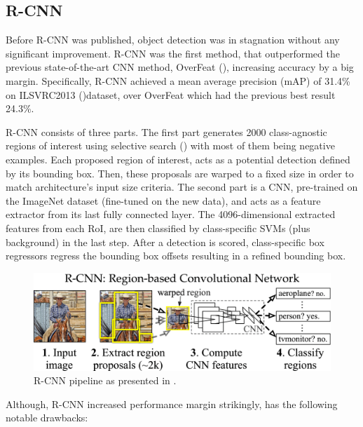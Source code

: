 \subsection{R-CNN}
Before R-CNN was published, object detection was in stagnation without any significant improvement. R-CNN was the first method, that outperformed the previous state-of-the-art CNN method, OverFeat (\cite{sermanet2013overfeat}), increasing accuracy by a big margin. Specifically, R-CNN achieved a mean average precision (mAP) of 31.4\% on ILSVRC2013 (\cite{deng2009imagenet})dataset, over OverFeat which had the previous best result 24.3\%.

R-CNN consists of three parts. The first part generates 2000 class-agnostic regions of interest using selective search (\cite{uijlings2013selective}) with most of them being negative examples. Each proposed region of interest, acts as a potential detection defined by its bounding box. Then, these proposals are warped to a fixed size in order to match architecture's input size criteria. 
The second part is a CNN, pre-trained on the ImageNet dataset (fine-tuned on the new data), and acts as a feature extractor from its last fully connected layer.
The 4096-dimensional extracted features from each RoI, are then classified by class-specific SVMs (plus background) in the last step. After a detection is scored, class-specific box regressors regress the bounding box offsets resulting in a refined bounding box.

\begin{figure}[!htb]
  \centering
  \includegraphics[width=12cm]{images/ch2/fig2.png}
  \caption{R-CNN pipeline as presented in \cite{girshick2014rich}.}
  \label{fig2}
\end{figure}

Although, R-CNN increased performance margin strikingly, has the following notable drawbacks:

